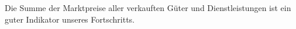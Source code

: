 Die Summe der Marktpreise aller verkauften Güter und Dienstleistungen ist ein guter Indikator unseres Fortschritts.